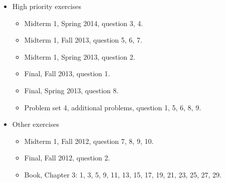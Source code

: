 \documentclass[11pt]{article}
\begin{document}
\begin{itemize}
\item High priority exercises
	\begin{itemize}
		\item Midterm 1, Spring 2014, question 3, 4.
		\item Midterm 1, Fall 2013, question 5, 6, 7.
		\item Midterm 1, Spring 2013, question 2.
		\item Final, Fall 2013, question 1.
		\item Final, Spring 2013, question 8.
		\item Problem set 4, additional problems, question 1, 5, 6, 8, 9.
	\end{itemize}
\item Other exercises
	\begin{itemize}
		\item Midterm 1, Fall 2012, question 7, 8, 9, 10.
		\item Final, Fall 2012, question 2.
		\item Book, Chapter 3: 1, 3, 5, 9, 11, 13, 15, 17, 19, 21, 23, 25, 27, 29.
	\end{itemize}
\end{itemize}
\end{document}
